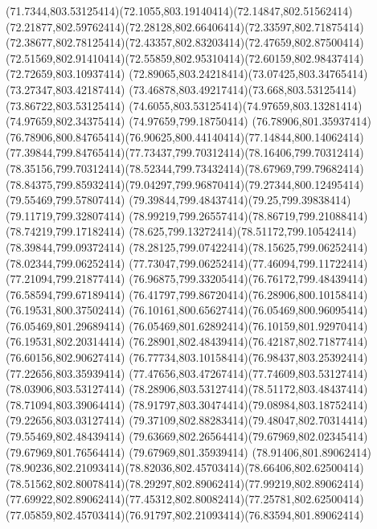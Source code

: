 {{	\curveto(71.7344,803.53125414)(72.1055,803.19140414)(72.14847,802.51562414)
	\curveto(72.21877,802.59762414)(72.28128,802.66406414)(72.33597,802.71875414)
	\curveto(72.38677,802.78125414)(72.43357,802.83203414)(72.47659,802.87500414)
	\curveto(72.51569,802.91410414)(72.55859,802.95310414)(72.60159,802.98437414)
	\lineto(72.72659,803.10937414)
	\curveto(72.89065,803.24218414)(73.07425,803.34765414)(73.27347,803.42187414)
	\curveto(73.46878,803.49217414)(73.668,803.53125414)(73.86722,803.53125414)
	\curveto(74.6055,803.53125414)(74.97659,803.13281414)(74.97659,802.34375414)
	\lineto(74.97659,799.18750414)
	\closepath
	\moveto(76.78906,801.35937414)
	\curveto(76.78906,800.84765414)(76.90625,800.44140414)(77.14844,800.14062414)
	\curveto(77.39844,799.84765414)(77.73437,799.70312414)(78.16406,799.70312414)
	\curveto(78.35156,799.70312414)(78.52344,799.73432414)(78.67969,799.79682414)
	\curveto(78.84375,799.85932414)(79.04297,799.96870414)(79.27344,800.12495414)
	\lineto(79.55469,799.57807414)
	\curveto(79.39844,799.48437414)(79.25,799.39838414)(79.11719,799.32807414)
	\curveto(78.99219,799.26557414)(78.86719,799.21088414)(78.74219,799.17182414)
	\curveto(78.625,799.13272414)(78.51172,799.10542414)(78.39844,799.09372414)
	\curveto(78.28125,799.07422414)(78.15625,799.06252414)(78.02344,799.06252414)
	\curveto(77.73047,799.06252414)(77.46094,799.11722414)(77.21094,799.21877414)
	\curveto(76.96875,799.33205414)(76.76172,799.48439414)(76.58594,799.67189414)
	\curveto(76.41797,799.86720414)(76.28906,800.10158414)(76.19531,800.37502414)
	\curveto(76.10161,800.65627414)(76.05469,800.96095414)(76.05469,801.29689414)
	\curveto(76.05469,801.62892414)(76.10159,801.92970414)(76.19531,802.20314414)
	\curveto(76.28901,802.48439414)(76.42187,802.71877414)(76.60156,802.90627414)
	\curveto(76.77734,803.10158414)(76.98437,803.25392414)(77.22656,803.35939414)
	\curveto(77.47656,803.47267414)(77.74609,803.53127414)(78.03906,803.53127414)
	\curveto(78.28906,803.53127414)(78.51172,803.48437414)(78.71094,803.39064414)
	\curveto(78.91797,803.30474414)(79.08984,803.18752414)(79.22656,803.03127414)
	\curveto(79.37109,802.88283414)(79.48047,802.70314414)(79.55469,802.48439414)
	\curveto(79.63669,802.26564414)(79.67969,802.02345414)(79.67969,801.76564414)
	\lineto(79.67969,801.35939414)
	\closepath
	\moveto(78.91406,801.89062414)
	\curveto(78.90236,802.21093414)(78.82036,802.45703414)(78.66406,802.62500414)
	\curveto(78.51562,802.80078414)(78.29297,802.89062414)(77.99219,802.89062414)
	\curveto(77.69922,802.89062414)(77.45312,802.80082414)(77.25781,802.62500414)
	\curveto(77.05859,802.45703414)(76.91797,802.21093414)(76.83594,801.89062414)
}}
